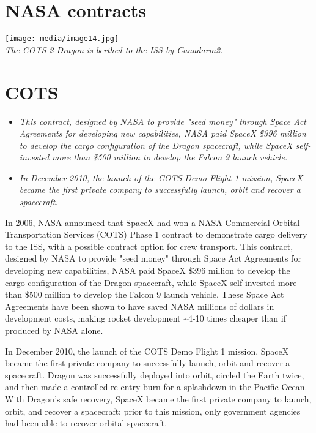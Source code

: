 \section{NASA contracts}\label{nasa-contracts}

\texttt{[image: media/image14.jpg]}\\
\emph{The COTS 2 Dragon is berthed to the ISS by Canadarm2.}

\section{COTS}\label{cots}

\begin{itemize}
\item
  \emph{This contract, designed by NASA to provide "seed money" through
  Space Act Agreements for developing new capabilities, NASA paid SpaceX
  \$396 million to develop the cargo configuration of the Dragon
  spacecraft, while SpaceX self-invested more than \$500 million to
  develop the Falcon 9 launch vehicle.}
\item
  \emph{In December 2010, the launch of the COTS Demo Flight 1 mission,
  SpaceX became the first private company to successfully launch, orbit
  and recover a spacecraft.}
\end{itemize}

In 2006, NASA announced that SpaceX had won a NASA Commercial Orbital
Transportation Services (COTS) Phase 1 contract to demonstrate cargo
delivery to the ISS, with a possible contract option for crew transport.
This contract, designed by NASA to provide "seed money" through Space
Act Agreements for developing new capabilities, NASA paid SpaceX \$396
million to develop the cargo configuration of the Dragon spacecraft,
while SpaceX self-invested more than \$500 million to develop the Falcon
9 launch vehicle. These Space Act Agreements have been shown to have
saved NASA millions of dollars in development costs, making rocket
development \textasciitilde{}4-10 times cheaper than if produced by NASA
alone.

In December 2010, the launch of the COTS Demo Flight 1 mission, SpaceX
became the first private company to successfully launch, orbit and
recover a spacecraft. Dragon was successfully deployed into orbit,
circled the Earth twice, and then made a controlled re-entry burn for a
splashdown in the Pacific Ocean. With Dragon's safe recovery, SpaceX
became the first private company to launch, orbit, and recover a
spacecraft; prior to this mission, only government agencies had been
able to recover orbital spacecraft.

